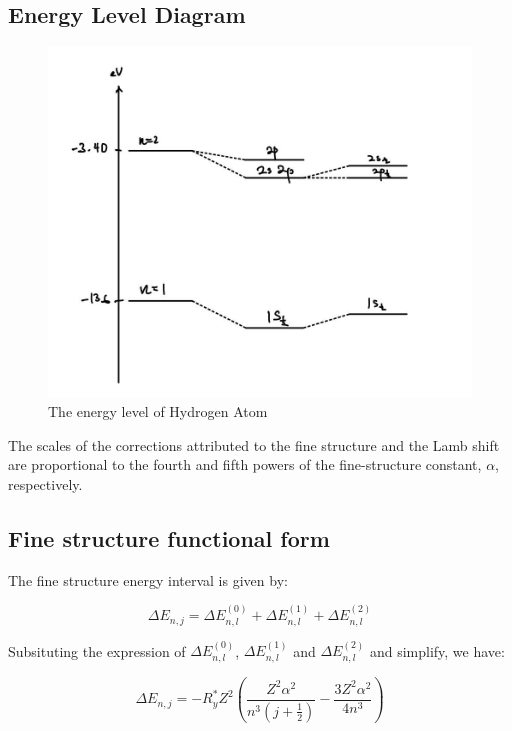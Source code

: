 \documentclass[11pt]{article}
\begin{document}
    \subsection{Energy Level Diagram}
    \begin{figure}[h!]
        \centering
        \includegraphics[width=5in]{./image/EnergyLevel.jpg}
        \caption{The energy level of Hydrogen Atom}
      \end{figure}

    The scales of the corrections attributed to the fine structure and the 
    Lamb shift are proportional to the fourth and fifth powers of the fine-structure constant, 
    $\alpha$, respectively.  

    \newpage
    \subsection{Fine structure functional form}
    The fine structure energy interval is given by:

    \begin{equation}
        \Delta E_{n,j} = \Delta E_{n,l}^{(0)} + \Delta E_{n,l}^{(1)} + \Delta E_{n,l}^{(2)}
    \end{equation}

    Subsituting the expression of $\Delta E_{n,l}^{(0)}$, $\Delta E_{n,l}^{(1)}$ and $\Delta E_{n,l}^{(2)}$ and simplify, we have:

    \begin{equation}
        \Delta E_{n,j} = -R^*_y Z^2 \left( \frac{Z^2 \alpha^2}{n^3 (j + \frac{1}{2})} - \frac{3 Z^2 \alpha^2}{4n^3}\right)
    \end{equation}
\end{document}
